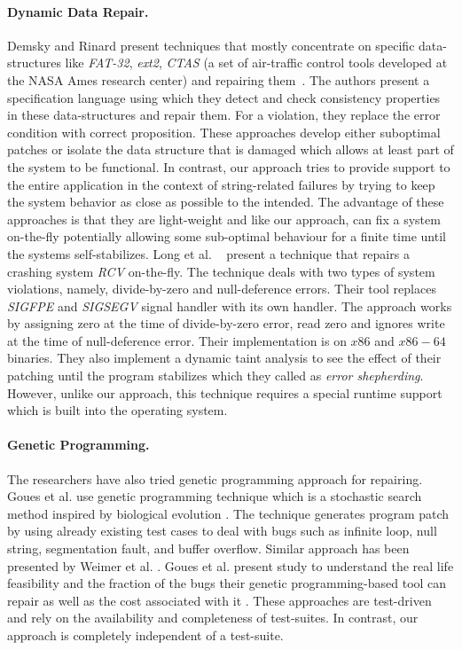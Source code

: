 \paragraph{Dynamic Data Repair.}
Demsky and Rinard present techniques that mostly concentrate on specific
data-structures like \emph{FAT-32}, \emph{ext2}, \emph{CTAS} (a set of
air-traffic control tools developed at the NASA Ames research center) and
repairing them~\cite{Demsky03automaticdata, conf/issre/DemskyR03,conf/oopsla/DemskyR03,
conf/issta/DemskyEGMPR06}. The authors present a specification language using which they
detect and check consistency properties in these data-structures and repair them.
For a violation, they replace the error condition with correct proposition.
These approaches develop either suboptimal patches or
isolate the data structure that is damaged which allows at least part of the
system to be functional. In contrast,
our approach tries to provide support to the entire application in the context of string-related failures
by trying to keep the system behavior
as close as possible to the intended. The advantage of these approaches is that they are
light-weight and like our approach, can fix a system on-the-fly
potentially allowing some sub-optimal behaviour for a finite time until the
systems self-stabilizes.
Long et al. ~\cite{conf/pldi/LongSR14}
present a technique that repairs a crashing system \emph{RCV} on-the-fly.
The technique deals with two types of system violations, namely, divide-by-zero and
null-deference errors. Their tool replaces \emph{SIGFPE} and \emph{SIGSEGV}
signal handler with its own handler. The approach works by assigning zero
at the time of divide-by-zero error, read zero and ignores write at the time of
null-deference error. Their implementation is on $x86$ and $x86-64$ binaries.
They also implement a dynamic taint analysis to see the effect of their
patching until the program stabilizes which they called as \emph{error
shepherding}. However, unlike our approach, this technique requires a special runtime support which is 
built into the operating system.

\paragraph{Genetic Programming.}
The researchers have also tried genetic programming approach for repairing.
Goues et al. use genetic programming technique which is a stochastic search
method inspired by biological evolution \cite{GouesNFW12}. The technique generates program patch
by using already existing test cases to deal with bugs such as infinite loop, null
string, segmentation fault, and buffer overflow. Similar approach has been presented by 
Weimer et al. \cite{WeimerFGN10}. Goues et al. present study to understand the real life feasibility and
the fraction of the bugs their genetic programming-based tool can repair as well as the cost associated
with it \cite{GouesDFW12}. These approaches are test-driven and rely on the availability and completeness of test-suites.
In contrast, our approach is completely independent of a test-suite.

